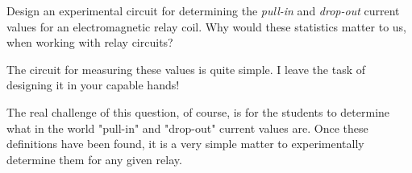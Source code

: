 

Design an experimental circuit for determining the {\it pull-in} and {\it drop-out} current values for an electromagnetic relay coil.  Why would these statistics matter to us, when working with relay circuits?







The circuit for measuring these values is quite simple.  I leave the task of designing it in your capable hands!







The real challenge of this question, of course, is for the students to determine what in the world "pull-in" and "drop-out" current values are.  Once these definitions have been found, it is a very simple matter to experimentally determine them for any given relay.



